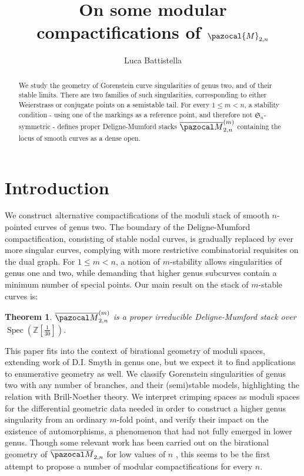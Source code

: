 \documentclass[11pt]{amsart}
\title{On some modular compactifications of $\pazocal{M}_{2,n}$}
\author{Luca Battistella}
\newcommand{\oM}{\overline{\pazocal M}}
\theoremstyle{plain}
\newtheorem*{teo*}{Theorem}
\theoremstyle{definition}
\begin{document}
\begin{abstract}
We study the geometry of Gorenstein curve singularities of genus two, and of their stable limits. There are two families of such singularities, corresponding to either Weierstrass or conjugate points on a semistable tail. For every $1\leq m <n$, a stability condition - using one of the markings as a reference point, and therefore not $\mathfrak S_n$-symmetric - defines proper Deligne-Mumford stacks $\oM_{2,n}^{(m)}$ containing the locus of smooth curves as a dense open.
\end{abstract}

\maketitle
\tableofcontents

\section{Introduction}
We construct alternative compactifications of the moduli stack of smooth $n$-pointed curves of genus two. The boundary of the Deligne-Mumford compactification, consisting of stable nodal curves, is gradually replaced by ever more singular curves, complying with more restrictive combinatorial requisites on the dual graph. For $1\leq m <n$, a notion of $m$-stability allows singularities of genus one and two, while demanding that higher genus subcurves contain a minimum number of special points. Our main result on the stack of $m$-stable curves is:
\begin{teo*}
 $\oM^{(m)}_{2,n}$ is a \emph{proper} irreducible Deligne-Mumford stack over $\operatorname{Spec}(\mathbb Z[\frac{1}{30}])$.
\end{teo*}
This paper fits into the context of birational geometry of moduli spaces, extending work of D.I. Smyth in genus one, but we expect it to find applications to enumerative geometry as well. We classify Gorenstein singularities of genus two with any number of branches, and their (semi)stable models, highlighting the relation with Brill-Noether theory. We interpret crimping spaces as moduli spaces for the differential geometric data needed in order to construct a higher genus singularity from an ordinary $m$-fold point, and verify their impact on the existence of automorphisms, a phenomenon that had not fully emerged in lower genus. Though some relevant work has been carried out on the birational geometry of $\oM_{2,n}$ for low values of $n$ \cite{Hassettg2,Rulla, FedorchukGrimes,PolishchukJohnson}, this seems to be the first attempt to propose a number of modular compactifications for every $n$.
\end{document}
